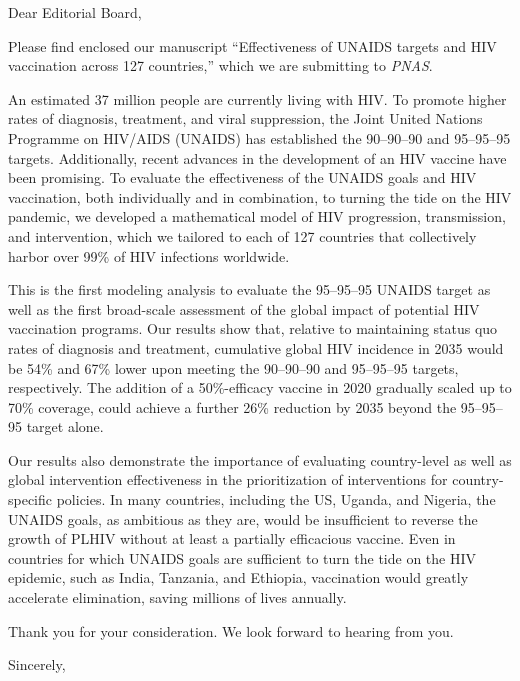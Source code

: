 \documentclass[12pt]{jpmletter}
\begin{document}
  \begin{letter}{}

    \opening{Dear Editorial Board,}
 
    Please find enclosed our manuscript ``Effectiveness of UNAIDS
    targets and HIV vaccination across 127 countries,'' which we are
    submitting to \textit{PNAS}.
 
    An estimated 37 million people are currently living with HIV. To
    promote higher rates of diagnosis, treatment, and viral
    suppression, the Joint United Nations Programme on HIV/AIDS
    (UNAIDS) has established the 90–90–90 and 95–95–95
    targets. Additionally, recent advances in the development of an
    HIV vaccine have been promising. To evaluate the effectiveness of
    the UNAIDS goals and HIV vaccination, both individually and in
    combination, to turning the tide on the HIV pandemic, we developed
    a mathematical model of HIV progression, transmission, and
    intervention, which we tailored to each of 127 countries that
    collectively harbor over 99\% of HIV infections worldwide.

    This is the first modeling analysis to evaluate the 95–95–95
    UNAIDS target as well as the first broad-scale assessment of the
    global impact of potential HIV vaccination programs. Our results
    show that, relative to maintaining status quo rates of diagnosis
    and treatment, cumulative global HIV incidence in 2035 would be
    54\% and 67\% lower upon meeting the 90–90–90 and 95–95–95
    targets, respectively. The addition of a 50\%-efficacy vaccine in
    2020 gradually scaled up to 70\% coverage, could achieve a further
    26\% reduction by 2035 beyond the 95–95–95 target alone.

    Our results also demonstrate the importance of evaluating
    country-level as well as global intervention effectiveness in the
    prioritization of interventions for country-specific policies. In
    many countries, including the US, Uganda, and Nigeria, the UNAIDS
    goals, as ambitious as they are, would be insufficient to reverse
    the growth of PLHIV without at least a partially efficacious
    vaccine. Even in countries for which UNAIDS goals are sufficient
    to turn the tide on the HIV epidemic, such as India, Tanzania, and
    Ethiopia, vaccination would greatly accelerate elimination, saving
    millions of lives annually.
 
    Thank you for your consideration. We look forward to hearing from
    you.

    \closing{Sincerely,}

  \end{letter}
\end{document}
